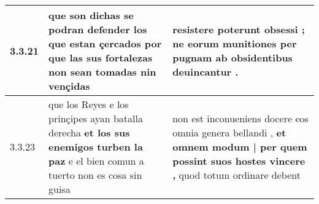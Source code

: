 \begin{tabular}{|p{1cm}|p{6.5cm}|p{6.5cm}|}
3.3.21 & que son dichas se podran defender los que estan çercados \textbf{ por que las sus fortalezas non sean tomadas } nin vençidas & resistere poterunt obsessi ; \textbf{ ne eorum munitiones } per pugnam ab obsidentibus deuincantur . \\\hline
3.3.23 & que los Reyes e los prinçipes ayan batalla derecha \textbf{ et los sus enemigos turben la paz } e el bien comun a tuerto non es cosa sin guisa & non est inconueniens docere eos omnia genera bellandi , \textbf{ et omnem modum | per quem possint suos hostes vincere , } quod totum ordinare debent \\\hline

\end{tabular}
